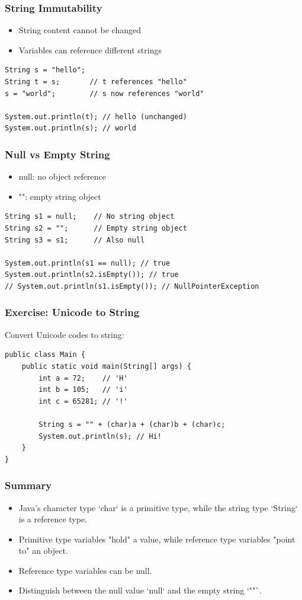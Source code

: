 \documentclass[serif, aspectratio=169]{beamer}
\begin{document}
\begin{frame}[fragile]
\frametitle{String Immutability}
\begin{itemize}
    \item String content cannot be changed
    \item Variables can reference different strings
\end{itemize}
\begin{lstlisting}
String s = "hello";
String t = s;       // t references "hello"
s = "world";        // s now references "world"

System.out.println(t); // hello (unchanged)
System.out.println(s); // world
\end{lstlisting}
\end{frame}

\begin{frame}[fragile]
\frametitle{Null vs Empty String}
\begin{itemize}
    \item null: no object reference
    \item "": empty string object
\end{itemize}
\begin{lstlisting}
String s1 = null;    // No string object
String s2 = "";      // Empty string object
String s3 = s1;      // Also null

System.out.println(s1 == null); // true
System.out.println(s2.isEmpty()); // true
// System.out.println(s1.isEmpty()); // NullPointerException
\end{lstlisting}
\end{frame}

\begin{frame}[fragile]
\frametitle{Exercise: Unicode to String}
Convert Unicode codes to string:
\begin{lstlisting}
public class Main {
    public static void main(String[] args) {
        int a = 72;    // 'H'
        int b = 105;   // 'i'
        int c = 65281; // '!'
        
        String s = "" + (char)a + (char)b + (char)c;
        System.out.println(s); // Hi!
    }
}
\end{lstlisting}
\end{frame}

\begin{frame}[fragile]
\frametitle{Summary}
\begin{itemize}
    \item Java's character type `char` is a primitive type, while the string type `String` is a reference type.
    \item Primitive type variables "hold" a value, while reference type variables "point to" an object.
    \item Reference type variables can be null.
    \item Distinguish between the null value `null` and the empty string `""`.
\end{itemize}
\end{frame}
\end{document}
